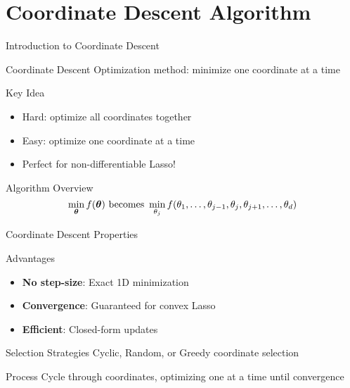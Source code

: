 \documentclass{beamer}
\begin{document}
\section{Coordinate Descent Algorithm}

\begin{frame}{Introduction to Coordinate Descent}
\begin{definitionbox}{Coordinate Descent}
Optimization method: minimize one coordinate at a time
\end{definitionbox}
\pause

\begin{keypointsbox}{Key Idea}
{\footnotesize
\begin{itemize}
\item Hard: optimize all coordinates together
\item Easy: optimize one coordinate at a time
\item Perfect for non-differentiable Lasso!
\end{itemize}
}
\end{keypointsbox}

\begin{codebox}{Algorithm Overview}
$$\min_{\boldsymbol{\theta}} f(\boldsymbol{\theta}) \text{ becomes } \min_{\theta_j} f(\theta_1, \ldots, \theta_{j-1}, \theta_j, \theta_{j+1}, \ldots, \theta_d)$$
\end{codebox}
\end{frame}

\begin{frame}{Coordinate Descent Properties}
\begin{keypointsbox}{Advantages}
{\footnotesize
\begin{itemize}
\item \textbf{No step-size}: Exact 1D minimization
\item \textbf{Convergence}: Guaranteed for convex Lasso
\item \textbf{Efficient}: Closed-form updates
\end{itemize}
}
\end{keypointsbox}
\pause

\begin{codebox}{Selection Strategies}
{\footnotesize Cyclic, Random, or Greedy coordinate selection}
\end{codebox}

\begin{alertbox}{Process}
Cycle through coordinates, optimizing one at a time until convergence
\end{alertbox}
\end{frame}
\end{document}
